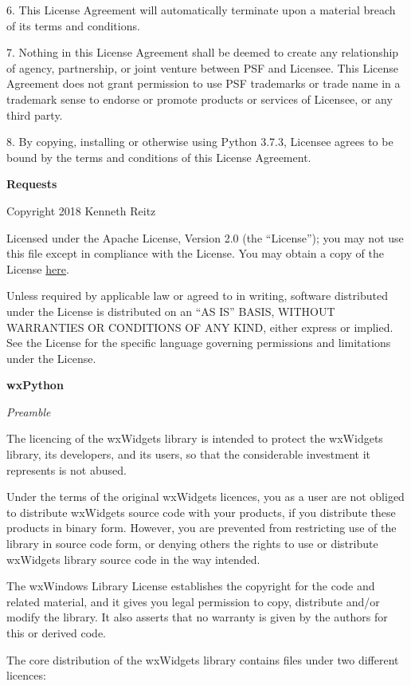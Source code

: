 6. This License Agreement will automatically terminate upon a material breach of
its terms and conditions.
 
7. Nothing in this License Agreement shall be deemed to create any relationship
of agency, partnership, or joint venture between PSF and Licensee.  This License
Agreement does not grant permission to use PSF trademarks or trade name in a
trademark sense to endorse or promote products or services of Licensee, or any
third party.
 
8. By copying, installing or otherwise using Python 3.7.3, Licensee agrees
to be bound by the terms and conditions of this License Agreement.
 
 \textbf{Requests}
 
Copyright 2018 Kenneth Reitz

Licensed under the Apache License, Version 2.0 (the “License”); you may not use this file except in compliance with the License. You may obtain a copy of the License \href{https://www.apache.org/licenses/LICENSE-2.0}{here}.

Unless required by applicable law or agreed to in writing, software distributed under the License is distributed on an “AS IS” BASIS, WITHOUT WARRANTIES OR CONDITIONS OF ANY KIND, either express or implied. See the License for the specific language governing permissions and limitations under the License.

\textbf{wxPython}

\textit{Preamble}

The licencing of the wxWidgets library is intended to protect the wxWidgets
library, its developers, and its users, so that the considerable investment it
represents is not abused.

Under the terms of the original wxWidgets licences, you as a user are not
obliged to distribute wxWidgets source code with your products, if you
distribute these products in binary form. However, you are prevented from
restricting use of the library in source code form, or denying others the
rights to use or distribute wxWidgets library source code in the way intended.

The wxWindows Library License establishes the copyright for the code and
related material, and it gives you legal permission to copy, distribute and/or
modify the library. It also asserts that no warranty is given by the authors
for this or derived code.

The core distribution of the wxWidgets library contains files under two
different licences:

